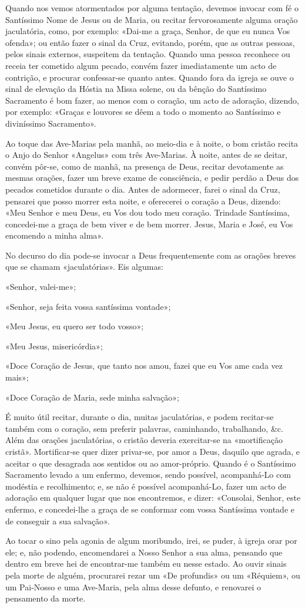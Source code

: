 Quando nos vemos atormentados por alguma tentação, devemos invocar com fé o Santíssimo Nome de Jesus ou de Maria, ou recitar fervorosamente alguma oração jaculatória, como, por exemplo: «Dai-me a graça, Senhor, de que eu nunca Vos ofenda»; ou então fazer o sinal da Cruz, evitando, porém, que as outras pessoas, pelos sinais externos, suspeitem da tentação. Quando uma pessoa reconhece ou receia ter cometido algum pecado, convém fazer imediatamente um acto de contrição, e procurar confessar-se quanto antes. Quando fora da igreja se ouve o sinal de elevação da Hóstia na Missa solene, ou da bênção do Santíssimo Sacramento é bom fazer, ao menos com o coração, um acto de adoração, dizendo, por exemplo: «Graças e louvores se dêem a todo o momento ao Santíssimo e diviníssimo Sacramento».\par
Ao toque das Ave-Marias pela manhã, ao meio-dia e à noite, o bom cristão recita o Anjo do Senhor «Angelus» com três Ave-Marias. À noite, antes de se deitar, convém pôr-se, como de manhã, na presença de Deus, recitar devotamente as mesmas orações, fazer um breve exame de consciência, e pedir perdão a Deus dos pecados cometidos durante o dia. Antes de adormecer, farei o sinal da Cruz, pensarei que posso morrer esta noite, e oferecerei o coração a Deus, dizendo: «Meu Senhor e meu Deus, eu Vos dou todo meu coração. Trindade Santíssima, concedei-me a graça de bem viver e de bem morrer. Jesus, Maria e José, eu Vos encomendo a minha alma».\par
No decurso do dia pode-se invocar a Deus frequentemente com as orações breves que se chamam «jaculatórias». Eis algumas:\par
«Senhor, valei-me»;\par
«Senhor, seja feita vossa santíssima vontade»;\par
«Meu Jesus, eu quero ser todo vosso»;\par
«Meu Jesus, misericórdia»;\par
«Doce Coração de Jesus, que tanto nos amou, fazei que eu Vos ame cada vez mais»;\par
«Doce Coração de Maria, sede minha salvação»;\par
É muito útil recitar, durante o dia, muitas jaculatórias, e podem recitar-se também com o coração, sem preferir palavras, caminhando, trabalhando, \&c. Além das orações jaculatórias, o cristão deveria exercitar-se na «mortificação cristã». Mortificar-se quer dizer privar-se, por amor a Deus, daquilo que agrada, e aceitar o que desagrada aos sentidos ou ao amor-próprio. Quando é o Santíssimo Sacramento levado a um enfermo, devemos, sendo possível, acompanhá-Lo com modéstia e recolhimento; e, se não é possível acompanhá-Lo, fazer um acto de adoração em qualquer lugar que nos encontremos, e dizer: «Consolai, Senhor, este enfermo, e concedei-lhe a graça de se conformar com vossa Santíssima vontade e de conseguir a sua salvação».\par
Ao tocar o sino pela agonia de algum moribundo, irei, se puder, à igreja orar por ele; e, não podendo, encomendarei a Nosso Senhor a sua alma, pensando que dentro em breve hei de encontrar-me também eu nesse estado. Ao ouvir sinais pela morte de alguém, procurarei rezar um «De profundis» ou um «Réquiem», ou um Pai-Nosso e uma Ave-Maria, pela alma desse defunto, e renovarei o pensamento da morte.

